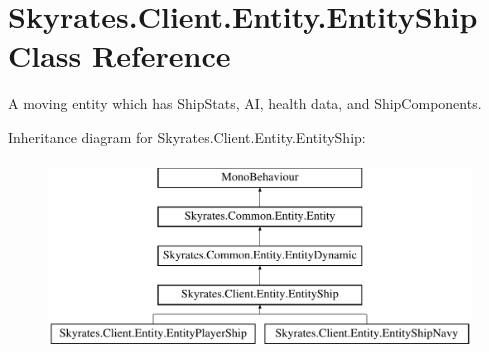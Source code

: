 \hypertarget{class_skyrates_1_1_client_1_1_entity_1_1_entity_ship}{\section{Skyrates.\-Client.\-Entity.\-Entity\-Ship Class Reference}
\label{class_skyrates_1_1_client_1_1_entity_1_1_entity_ship}
}


A moving entity which has Ship\-Stats, A\-I, health data, and Ship\-Components.  


Inheritance diagram for Skyrates.\-Client.\-Entity.\-Entity\-Ship\-:\begin{figure}[H]
\begin{center}
\leavevmode
\includegraphics[height=5.000000cm]{class_skyrates_1_1_client_1_1_entity_1_1_entity_ship}
\end{center}
\end{figure}
